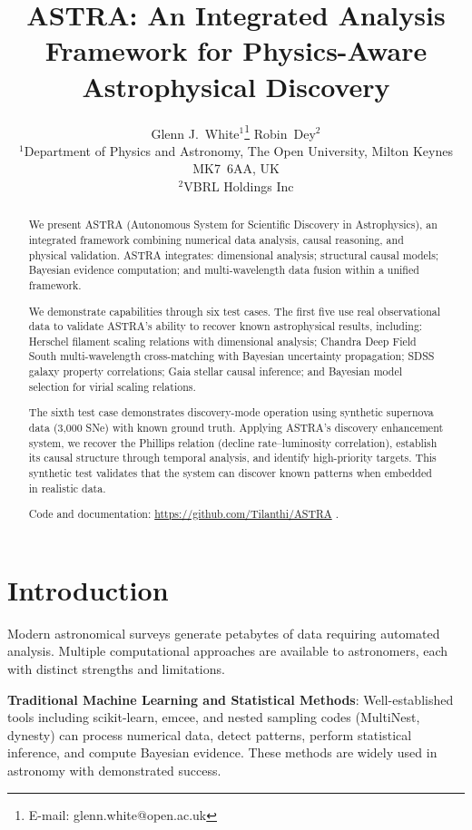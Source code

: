 \documentclass[usenatbib]{rasti}
\title[ASTRA: Integrated Analysis Framework for Astrophysics]{ASTRA: An Integrated Analysis Framework for Physics-Aware Astrophysical Discovery}
\author[White \& Dey]{
Glenn J.~White$^{1}$\thanks{E-mail: glenn.white@open.ac.uk}
Robin~Dey$^{2}$\\
$^{1}$Department of Physics and Astronomy, The Open University, Milton Keynes MK7~6AA, UK\\
$^{2}$VBRL Holdings Inc
}
\begin{document}

\maketitle

\label{firstpage}

\begin{abstract}
We present ASTRA (Autonomous System for Scientific Discovery in Astrophysics), an integrated framework combining numerical data analysis, causal reasoning, and physical validation. ASTRA integrates: dimensional analysis; structural causal models; Bayesian evidence computation; and multi-wavelength data fusion within a unified framework.

We demonstrate capabilities through six test cases. The first five use real observational data to validate ASTRA's ability to recover known astrophysical results, including: Herschel filament scaling relations with dimensional analysis; Chandra Deep Field South multi-wavelength cross-matching with Bayesian uncertainty propagation; SDSS galaxy property correlations; Gaia stellar causal inference; and Bayesian model selection for virial scaling relations.

The sixth test case demonstrates discovery-mode operation using synthetic supernova data (3,000 SNe) with known ground truth. Applying ASTRA's discovery enhancement system, we recover the Phillips relation (decline rate--luminosity correlation), establish its causal structure through temporal analysis, and identify high-priority targets. This synthetic test validates that the system can discover known patterns when embedded in realistic data.

Code and documentation: \url{https://github.com/Tilanthi/ASTRA} \cite{astra_github}.
\end{abstract}

\section{Introduction}

Modern astronomical surveys generate petabytes of data requiring automated analysis. Multiple computational approaches are available to astronomers, each with distinct strengths and limitations.

\textbf{Traditional Machine Learning and Statistical Methods}: Well-established tools including scikit-learn, emcee, and nested sampling codes (MultiNest, dynesty) can process numerical data, detect patterns, perform statistical inference, and compute Bayesian evidence. These methods are widely used in astronomy with demonstrated success.
\end{document}
